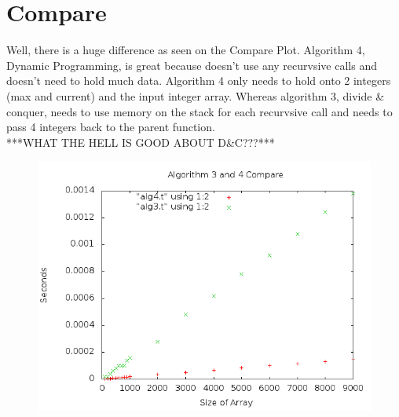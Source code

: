 \documentclass[a4paper,10pt]{article}
\begin{document}
	\section{Compare}
		Well, there is a huge difference as seen on the Compare Plot.
		Algorithm 4, Dynamic Programming, is great because doesn't use any recurvsive calls and doesn't need to hold much data.
		Algorithm 4 only needs to hold onto 2 integers (max and current) and the input integer array.  
		Whereas algorithm 3, divide & conquer, needs to use memory on the stack for each recurvsive call and needs to pass 4 integers back to the parent function.\\
		***WHAT THE HELL IS GOOD ABOUT D&C???***
		\begin{figure}[!htb]
			\centering
			\includegraphics[scale=.5]{timingfiles/algCompareplot.png}
		\end{figure}

		
		
\end{document}
